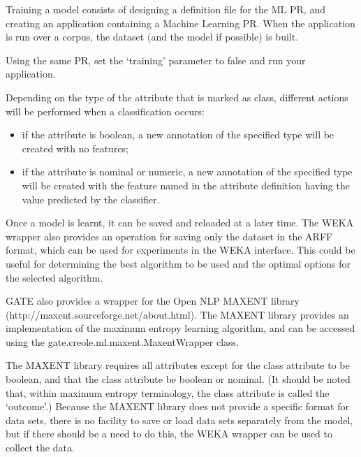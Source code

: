 Training a model consists of designing a definition file for the ML
PR, and creating an application containing a Machine Learning PR. When
the application is run over a corpus, the dataset (and the model if
possible) is built.


Using the same PR, set the `training' parameter to false and run your
application.

Depending on the type of the attribute that is marked as class, different
actions will be performed when a classification occurs:
\begin{itemize}
\item if the attribute is boolean, a new annotation of the specified type
will be created with no features;
\item if the attribute is nominal or numeric, a new annotation of the
specified type will be created with the feature named in the attribute
definition having the value predicted by the classifier.
\end{itemize}

Once a model is learnt, it can be saved and reloaded at a later time.
The WEKA wrapper also provides an operation for saving only the dataset
in the ARFF format, which can be used for experiments in the WEKA
interface. This could be useful for determining the best algorithm to be
used and the optimal options for the selected algorithm.


GATE also provides a wrapper for the Open NLP MAXENT library\\
(http://maxent.sourceforge.net/about.html). The MAXENT library provides an
implementation of the maximum entropy learning algorithm, and can be
accessed using the gate.creole.ml.maxent.MaxentWrapper class.

The MAXENT library requires all attributes except for the class
attribute to be boolean, and that the class attribute be boolean or nominal.
(It should be noted that, within maximum entropy terminology, the class
attribute is called the `outcome'.) Because the MAXENT library does not
provide a specific format for data sets, there is no facility to save or load
data sets separately from the model, but if there should be a need to do this,
the WEKA wrapper can be used to collect the data.

